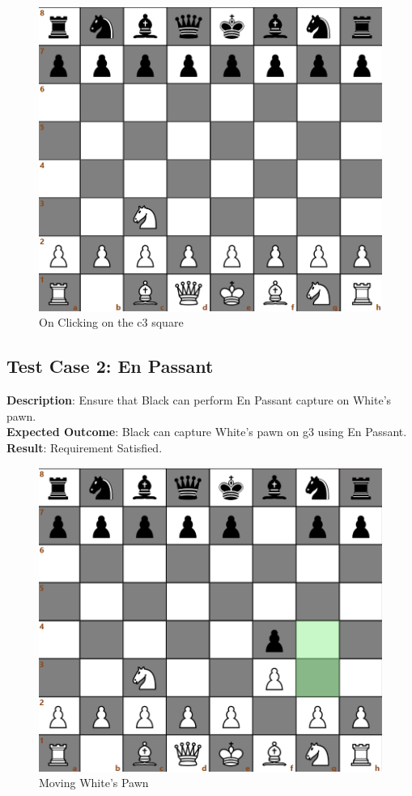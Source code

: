 \documentclass[a4paper,12pt]{article}
\begin{document}
\begin{figure}[H]
    \centering
    \includegraphics[width=0.7\linewidth]{Images/Test Cases/testCase1Img2.png}
    \caption{On Clicking on the c3 square}
    \label{fig:AfterKnightMove}
\end{figure}

\subsection{Test Case 2: En Passant}
\textbf{Description}: Ensure that Black can perform En Passant capture on White's pawn.\\
\textbf{Expected Outcome}: Black can capture White's pawn on g3 using En Passant.\\
\textbf{Result}: Requirement Satisfied.

\begin{figure}[H]
    \centering
    \includegraphics[width=0.7\linewidth]{Images/Test Cases/testCase2Img1.png}
    \caption{Moving White's Pawn}
    \label{fig:WhiteMove}
\end{figure}
\end{document}
